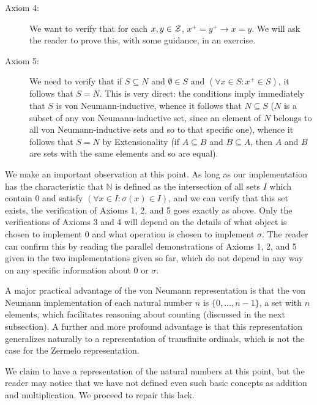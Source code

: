 \documentclass[12pt]{book}
\begin{document}
\begin{description}
\begin{description}
\item[Axiom 4:]  We want to verify that for each $x,y \in \cal Z$, $x^+=y^+ \rightarrow x=y$.  We will ask the reader to prove this, with some guidance, in an exercise.

\item[Axiom 5:]  We need to verify that if $S \subseteq N$ and $\emptyset \in S$ and $(\forall x\in S:x^+ \in S)$, it follows that $S=N$.  This is very direct:  the conditions imply immediately that $S$ is von Neumann-inductive, whence it follows that $N \subseteq S$  ($N$ is a subset of any von Neumann-inductive set, since an element of $N$ belongs to all von Neumann-inductive sets and so to that specific one), whence it follows that $S = N$ by Extensionality (if $A \subseteq B$ and $B \subseteq A$, then $A$ and $B$ are sets with the same elements and so are equal).

\end{description}

\end{description}

We make an important observation at this point.  As long as our implementation has the characteristic that $\mathbb N$ is defined as the intersection of all sets $I$ which
contain 0 and satisfy $(\forall x \in I:\sigma(x) \in I)$, and we can verify that this set exists, the verification of Axioms 1, 2, and 5 goes exactly as above.  Only the verifications of Axioms 3 and 4 will depend on the details of what object is chosen to implement 0 and what operation is chosen to implement $\sigma$.  The reader can confirm this by reading the parallel demonstrations of Axioms 1, 2, and 5 given in the two implementations given so far, which do not depend in any way on any specific information about 0 or $\sigma$.

A major practical advantage of the von Neumann representation is that the von Neumann implementation of each natural number $n$ is $\{0,\ldots,n-1\}$, a set with $n$ elements, which facilitates reasoning about counting (discussed in the next subsection).  A further and more profound advantage is that this representation generalizes naturally to a representation of transfinite ordinals, which is not the case for the Zermelo representation.

We claim to have a representation of the natural numbers at this point, but the reader may notice that we have not defined even such basic concepts as addition and multiplication.  We proceed to repair this lack.
\end{document}
